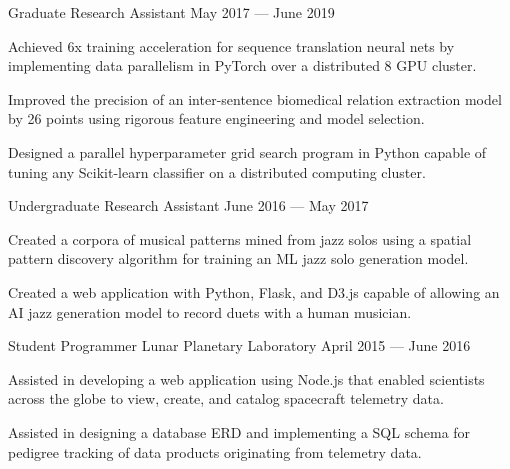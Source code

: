 \begin{cventries}
{\begin{cvitems}
      \end{cvitems}
    }
    \vspace{.07cm}
  \cventry
    {Graduate Research Assistant} %
    {} %
    {} %
    {May 2017 --- June 2019} %
    {
      \vspace{-0.1cm}
      \begin{cvitems} %
        \item Achieved 6x training acceleration for sequence translation neural nets by implementing data parallelism in PyTorch over a distributed 8 GPU cluster.
        \item Improved the precision of an inter-sentence biomedical relation extraction model by 26 points using rigorous feature engineering and model selection.
        \item Designed a parallel hyperparameter grid search program in Python capable of tuning any Scikit-learn classifier on a distributed computing cluster.
      \end{cvitems}
    }
    \vspace{.07cm}
  \cventry
    {Undergraduate Research Assistant} %
    {} %
    {} %
    {June 2016 --- May 2017} %
    {
      \vspace{-0.1cm}
      \begin{cvitems} %
        \item Created a corpora of musical patterns mined from jazz solos using a spatial pattern discovery algorithm for training an ML jazz solo generation model.
        \item Created a web application with Python, Flask, and D3.js capable of allowing an AI jazz generation model to record duets with a human musician.
      \end{cvitems}
    }
    \vspace{.2cm}
  \cventry
    {Student Programmer} %
    {Lunar Planetary Laboratory} %
    {April 2015 --- June 2016} %
    {} %
    {
      \vspace{-0.1cm}
      \begin{cvitems} %
        \item Assisted in developing a web application using Node.js that enabled scientists across the globe to view, create, and catalog spacecraft telemetry data.
        \item Assisted in designing a database ERD and implementing a SQL schema for pedigree tracking of data products originating from telemetry data.
      \end{cvitems}
    }

\end{cventries}
